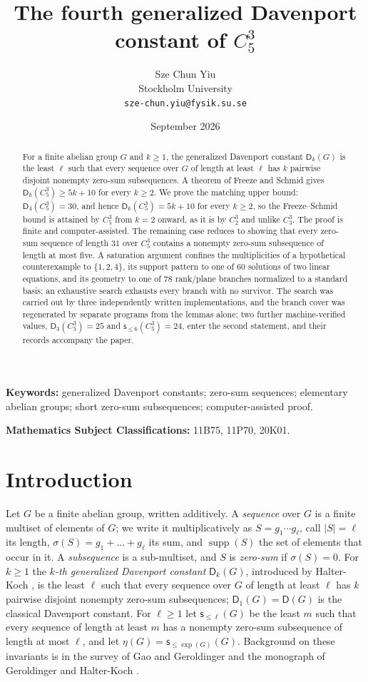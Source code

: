 \documentclass[11pt]{article}
\title{The fourth generalized Davenport constant of $C_5^3$}
\author{Sze Chun Yiu\\Stockholm University\\\texttt{sze-chun.yiu@fysik.su.se}}
\date{September 2026}
\theoremstyle{definition}
\theoremstyle{remark}
\newcommand{\Dk}{\mathsf{D}}
\newcommand{\C}{C_5^{3}}
\newcommand{\supp}{\operatorname{supp}}
\newcommand{\sle}[1]{\mathsf{s}_{\le #1}}
\begin{document}
\maketitle
\begin{abstract}
For a finite abelian group $G$ and $k\ge1$, the generalized Davenport constant $\Dk_k(G)$ is the least $\ell$ such that every sequence over $G$ of length at least $\ell$ has $k$ pairwise disjoint nonempty zero-sum subsequences. A theorem of Freeze and Schmid gives $\Dk_k(\C)\ge 5k+10$ for every $k\ge2$. We prove the matching upper bound: $\Dk_4(\C)=30$, and hence $\Dk_k(\C)=5k+10$ for every $k\ge2$, so the Freeze--Schmid bound is attained by $\C$ from $k=2$ onward, as it is by $C_2^3$ and unlike $C_3^3$. The proof is finite and computer-assisted. The remaining case reduces to showing that every zero-sum sequence of length $31$ over $\C$ contains a nonempty zero-sum subsequence of length at most five. A saturation argument confines the multiplicities of a hypothetical counterexample to $\{1,2,4\}$, its support pattern to one of $60$ solutions of two linear equations, and its geometry to one of $78$ rank/plane branches normalized to a standard basis; an exhaustive search exhausts every branch with no survivor. The search was carried out by three independently written implementations, and the branch cover was regenerated by separate programs from the lemmas alone; two further machine-verified values, $\Dk_3(\C)=25$ and $\sle{6}(\C)=24$, enter the second statement, and their records accompany the paper.
\end{abstract}

\noindent\textbf{Keywords:} generalized Davenport constants; zero-sum sequences; elementary abelian groups; short zero-sum subsequences; computer-assisted proof.

\noindent\textbf{Mathematics Subject Classifications:} 11B75, 11P70, 20K01.

\section{Introduction}\label{sec:intro}

Let $G$ be a finite abelian group, written additively. A \emph{sequence} over $G$ is a finite multiset of elements of $G$; we write it multiplicatively as $S=g_1\cdots g_\ell$, call $|S|=\ell$ its length, $\sigma(S)=g_1+\dots+g_\ell$ its sum, and $\supp(S)$ the set of elements that occur in it. A \emph{subsequence} is a sub-multiset, and $S$ is \emph{zero-sum} if $\sigma(S)=0$. For $k\ge1$ the \emph{$k$-th generalized Davenport constant} $\Dk_k(G)$, introduced by Halter-Koch \cite{HalterKoch1992}, is the least $\ell$ such that every sequence over $G$ of length at least $\ell$ has $k$ pairwise disjoint nonempty zero-sum subsequences; $\Dk_1(G)=\Dk(G)$ is the classical Davenport constant. For $\ell\ge1$ let $\sle{\ell}(G)$ be the least $m$ such that every sequence of length at least $m$ has a nonempty zero-sum subsequence of length at most $\ell$, and let $\eta(G)=\sle{\exp(G)}(G)$. Background on these invariants is in the survey of Gao and Geroldinger \cite{GaoGeroldinger2006} and the monograph of Geroldinger and Halter-Koch \cite{GeroldingerHalterKoch2006}.
\end{document}
